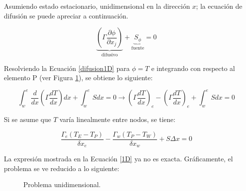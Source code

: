 \noindent
\justify

Asumiendo estado estacionario, unidimensional en la direcci\'on $x$; la ecuaci\'on de difusi\'on se puede apreciar a continuaci\'on.

\begin{equation}
\underbrace{\left( \Gamma \frac{\partial \phi}{\partial x_j} \right)}_{\text{difusivo}} + \underbrace{S_{\phi}}_{\text{fuente}} = 0
\label{difusion1D}
\end{equation}

\noindent
\justify

Resolviendo la Ecuaci\'on \ref{difusion1D} para $\phi = T$ e integrando con respecto al elemento P (ver Figura \ref{FVM1D}), se obtiene lo siguiente:

\begin{equation}
\int _w ^e \frac{d}{dx} \left( \Gamma \frac{dT}{dx} \right) dx + \int _w ^e S dx = 0 \rightarrow \left( \Gamma \frac{dT}{dx} \right) _e - \left( \Gamma \frac{dT}{dx} \right) _e + \int _w ^e S dx =  0
\end{equation}

\noindent
\justify

Si se asume que $T$ var\'ia linealmente entre nodos, se tiene:

\begin{equation}
\frac{\Gamma _e \left( T_E - T_P \right)}{\delta x_e} - \frac{\Gamma _w \left( T_P - T_W \right)}{\delta x_w} + S \Delta x = 0 
\label{1D}
\end{equation}

\noindent
\justify

La expresi\'on mostrada en la Ecuaci\'on \ref{1D} ya no es exacta. Gr\'aficamente, el problema se ve reducido a lo siguiente:

\begin{figure}[h!]
\centering
{}
\caption{Problema unidimensional.}
\label{FVM1D}
\end{figure}

